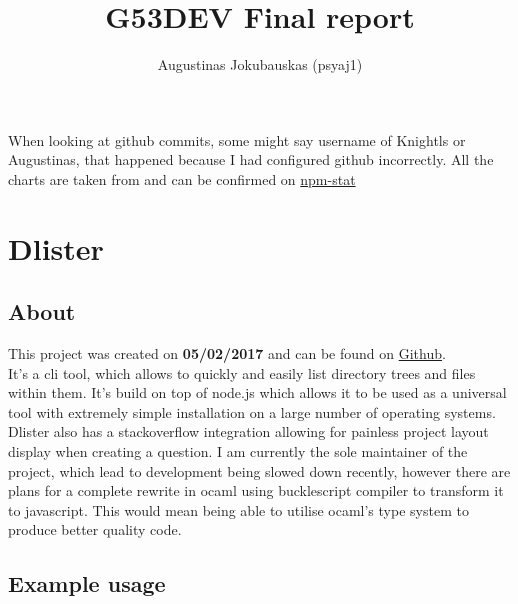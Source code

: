 \documentclass{article}
\title{G53DEV Final report}
\author{Augustinas Jokubauskas (psyaj1)}
\begin{document}
\maketitle

\begin{flushleft}
When looking at github commits, some might say username of Knightls or Augustinas, that happened because I had configured github incorrectly. All the charts are taken from and can be confirmed on \href{https://npm-stat.com}{npm-stat}
\end{flushleft}

\pagebreak

\tableofcontents

\newpage

\section{Dlister}

\subsection{About}

\begin{flushleft}
This project was created on \textbf{05/02/2017} and can be found on \href{https://github.com/WhoAteDaCake/dlister}{Github}. \\
It's a cli tool, which allows to quickly and easily list directory trees and files within them. It's build on top of node.js which allows it to be used as a universal tool with extremely simple installation on a large number of operating systems. Dlister also has a stackoverflow integration allowing for painless project layout display when creating a question. I am currently the sole maintainer of the project, which lead to development being slowed down recently, however there are plans for a complete rewrite in ocaml using bucklescript compiler to transform it to javascript. This would mean being able to utilise ocaml's type system to produce better quality code.
\end{flushleft}

\subsection{Example usage}
\end{document}
